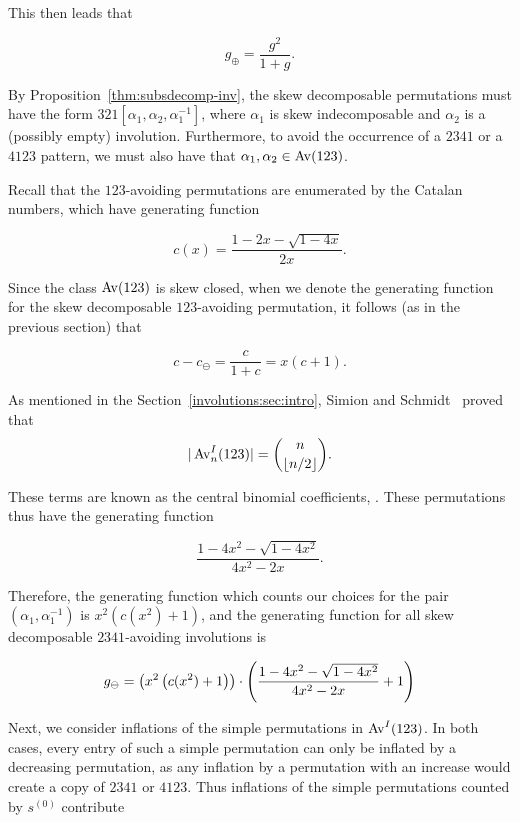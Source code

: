     This then leads that 

    \begin{equation}
      \label{involutions:eqn:2341-1}
      g_\oplus = \frac{g^2}{1+g}.
    \end{equation}

    By Proposition~\ref{thm:subsdecomp-inv}, the skew decomposable permutations
    must have the form $321[\alpha_1,\alpha_2,\alpha_1^{-1}]$, where $\alpha_1$ is
    skew indecomposable and $\alpha_2$ is a (possibly empty) involution.
    Furthermore, to avoid the occurrence of a $2341$ or a $4123$ pattern, we must
    also have that $\alpha_1,\alpha_2\in \operatorname{{Av}}(123)$.

    Recall that the $123$-avoiding permutations are enumerated by the Catalan numbers, which
    have generating function 

    $$ c(x) = \frac{1-2x-\sqrt{1-4x}}{2x}.$$

    Since the class $\operatorname{{Av}}(123)$ is skew closed, when we denote the generating
    function for the skew decomposable $123$-avoiding permutation, it follows
    (as in the previous section) that

    $$ c-c_\ominus = \frac{c}{1+c} = x(c+1).$$


    As mentioned in the Section~\ref{involutions:sec:intro}, Simion and
    Schmidt~\cite{Simion1985} proved that
    $$ |\operatorname{{Av}}^I_n(123)|={n\choose \lfloor n/2\rfloor}. $$

    These terms are known as the central binomial coefficients,
    . These permutations thus have the generating function

    $$ \frac{1-4x^2-\sqrt{1-4x^2}}{4x^2-2x}. $$

    Therefore, the generating function which counts our choices for the pair
    $(\alpha_1,\alpha_1^{-1})$ is $x^2(c(x^2)+1)$, and the generating function for
    all skew decomposable $2341$-avoiding involutions is

    \begin{equation}
    \label{involutions:eqn:2341-2}
      g_\ominus
      =
      \left({x^2\left({c(x^2)+1}\right)}\right)
      \cdot
      \left({\frac{1-4x^2-\sqrt{1-4x^2}}{4x^2-2x}+1}\right)
    \end{equation}

    Next, we consider inflations of the simple permutations in $\operatorname{{Av}}^I(123)$. In
    both cases, every entry of such a simple permutation can only be inflated by a
    decreasing permutation, as any inflation by a permutation with an increase
    would create a copy of $2341$ or $4123$. Thus inflations of the simple
    permutations counted by $s^{(0)}$ contribute

